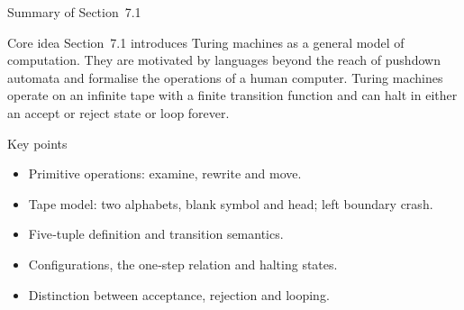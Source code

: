 \begin{frame}[t]{Summary of Section 7.1}
  \begin{tblock}{Core idea}
    Section 7.1 introduces Turing machines as a general model of
    computation.  They are motivated by languages beyond the reach of
    pushdown automata and formalise the operations of a human computer.
    Turing machines operate on an infinite tape with a finite
    transition function and can halt in either an accept or reject
    state or loop forever.
  \end{tblock}
  \begin{tblock}{Key points}
    \begin{itemize}
      \item Primitive operations: examine, rewrite and move.
      \item Tape model: two alphabets, blank symbol and head; left
        boundary crash.
      \item Five‑tuple definition and transition semantics.
      \item Configurations, the one‑step relation and halting states.
      \item Distinction between acceptance, rejection and looping.
    \end{itemize}
  \end{tblock}
  \label{fr:7.1-17}
\end{frame}

